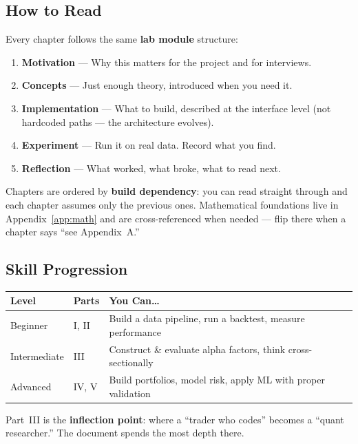 \documentclass[a4paper, 11pt]{report}
\theoremstyle{definition}
\theoremstyle{remark}
\begin{document}
\subsection*{How to Read}

Every chapter follows the same \textbf{lab module} structure:

\begin{enumerate}
    \item \textbf{Motivation} --- Why this matters for the project and for interviews.
    \item \textbf{Concepts} --- Just enough theory, introduced when you need it.
    \item \textbf{Implementation} --- What to build, described at the interface level
          (not hardcoded paths --- the architecture evolves).
    \item \textbf{Experiment} --- Run it on real data.  Record what you find.
    \item \textbf{Reflection} --- What worked, what broke, what to read next.
\end{enumerate}

Chapters are ordered by \textbf{build dependency}: you can read straight through
and each chapter assumes only the previous ones.  Mathematical foundations live
in Appendix~\ref{app:math} and are cross-referenced when needed --- flip there
when a chapter says ``see Appendix~A.''

\subsection*{Skill Progression}

\begin{center}
\begin{tabular}{@{}lll@{}}
\toprule
\textbf{Level} & \textbf{Parts} & \textbf{You Can\ldots} \\
\midrule
Beginner        & I, II       & Build a data pipeline, run a backtest, measure performance \\
Intermediate    & III         & Construct \& evaluate alpha factors, think cross-sectionally \\
Advanced        & IV, V       & Build portfolios, model risk, apply ML with proper validation \\
\bottomrule
\end{tabular}
\end{center}

Part~III is the \textbf{inflection point}: where a ``trader who codes'' becomes a
``quant researcher.''  The document spends the most depth there.
\end{document}
